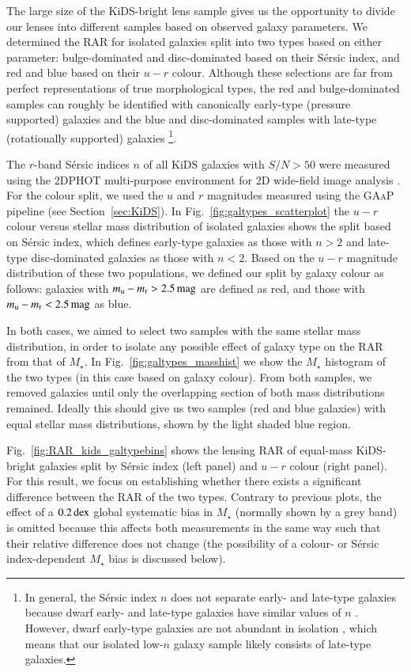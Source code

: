 \documentclass{aa}
\newcommand{\magn}{\,{\rm mag} }
\newcommand{\dex}{\,{\rm dex}}
\newcommand{\un}[1]{_{\rm #1}}
\begin{document}
The large size of the KiDS-bright lens sample gives us the opportunity to divide our lenses into different samples based on observed galaxy parameters. We determined the RAR for isolated galaxies split into two types based on either parameter: bulge-dominated and disc-dominated based on their S\'ersic index, and red and blue based on their $u-r$ colour. Although these selections are far from perfect representations of true morphological types, the red and bulge-dominated samples can roughly be identified with canonically early-type (pressure supported) galaxies and the blue and disc-dominated samples with late-type (rotationally supported) galaxies \cite[]{driver2006}\footnote{In general, the S\'ersic index $n$ does not separate early- and late-type galaxies because dwarf early- and late-type galaxies have similar values of $n$ \cite[]{graham2019}. However, dwarf early-type galaxies are not abundant in isolation \cite[]{janz2017}, which means that our isolated low-$n$ galaxy sample likely consists of late-type galaxies.}.

The $r$-band S\'ersic indices $n$ of all KiDS galaxies with $S/N > 50$ \citep[following][]{roy2018} were measured using the \textsc{2DPHOT} multi-purpose environment for 2D wide-field image analysis \mbox{\cite[]{barbera2008}}. For the colour split, we used the $u$ and $r$ magnitudes measured using the \textsc{GAaP} pipeline (see Section~\ref{sec:KiDS}). In Fig.~\ref{fig:galtypes_scatterplot} the $u-r$ colour versus stellar mass distribution of isolated galaxies shows the split based on S\'ersic index, which defines early-type galaxies as those with $n > 2$ and late-type disc-dominated galaxies as those with $n<2$. Based on the $u-r$ magnitude distribution of these two populations, we defined our split by galaxy colour as follows: galaxies with $m\un{u} - m\un{r} > 2.5 \magn$ are defined as red, and those with $m\un{u} - m\un{r} < 2.5 \magn$ as blue.

In both cases, we aimed to select two samples with the same stellar mass distribution, in order to isolate any possible effect of galaxy type on the RAR from that of $M_\star$. In Fig.~\ref{fig:galtypes_masshist} we show the $M_\star$ histogram of the two types (in this case based on galaxy colour). From both samples, we removed galaxies until only the overlapping section of both mass distributions remained. Ideally this should give us two samples (red and blue galaxies) with equal stellar mass distributions, shown by the light shaded blue region.

Fig.~\ref{fig:RAR_kids_galtypebins} shows the lensing RAR of equal-mass KiDS-bright galaxies split by S\'ersic index (left panel) and $u-r$ colour (right panel). For this result, we focus on establishing whether there exists a significant difference between the RAR of the two types. Contrary to previous plots, the effect of a $0.2 \dex$ global systematic bias in $M_\star$ (normally shown by a grey band) is omitted because this affects both measurements in the same way such that their relative difference does not change (the possibility of a colour- or S\'ersic index-dependent $M_\star$ bias is discussed below).
\end{document}
